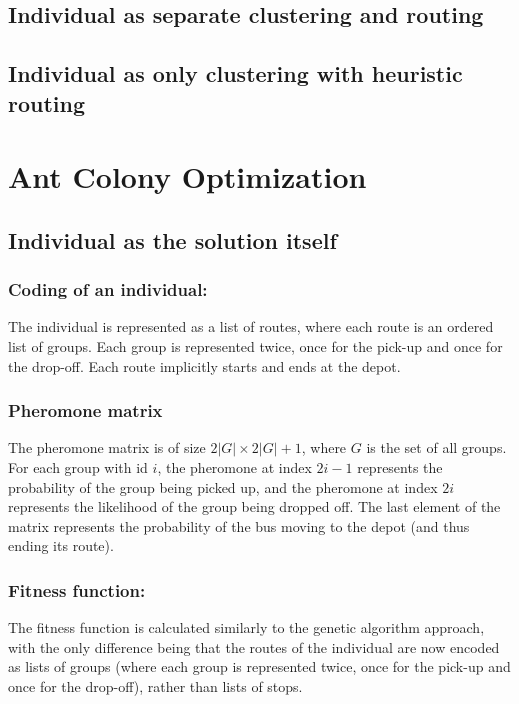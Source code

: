 
\subsection{Individual as separate clustering and routing}


\subsection{Individual as only clustering with heuristic routing}


\section{Ant Colony Optimization}


\subsection{Individual as the solution itself}


\subsubsection*{Coding of an individual:}
The individual is represented as a list of routes, where each route is an ordered list of groups. Each group is represented twice, once for the pick-up and once for the drop-off. Each route implicitly starts and ends at the depot.

\subsubsection*{Pheromone matrix}
The pheromone matrix is of size $2|G| \times 2|G| + 1$, where $G$ is the set of all groups. For each group with id $i$, the pheromone at index $2i - 1$ represents the probability of the group being picked up, and the pheromone at index $2i$ represents the likelihood of the group being dropped off. The last element of the matrix represents the probability of the bus moving to the depot (and thus ending its route).

\subsubsection*{Fitness function:}
The fitness function is calculated similarly to the genetic algorithm approach, with the only difference being that the routes of the individual are now encoded as lists of groups (where each group is represented twice, once for the pick-up and once for the drop-off), rather than lists of stops.

